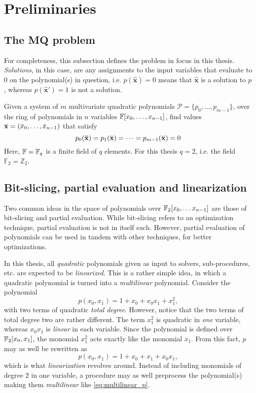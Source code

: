 \section{Preliminaries} \label{sec:prereq}
\subsection{The MQ problem} \label{sec:prereq:problem}
For completeness, this subsection defines the problem in focus in this thesis. \textit{Solutions}, in this case, are any assignments to the input variables that evaluate to $0$ on the polynomial(s) in question, i.e. $p(\hat{\mathbf{x}}) = 0$ means that $\hat{\mathbf{x}}$ is a solution to $p$, whereas $p(\hat{\mathbf{x}}') = 1$ is not a solution.
\begin{defn}\label{sec1:def:mq}
    Given a system of $m$ multivariate quadratic polynomials $\mathcal{P} = \{p_{0}, \dots, p_{m-1}\}$, over the ring of polynomials in $n$ variables $\mathbb{F}[x_0, \dots, x_{n - 1}]$, find values $\Bar{\mathbf{x}} = (\Bar{x}_0, \dots, \Bar{x}_{n - 1})$ that satisfy
    $$
        p_{0}(\mathbf{\Bar{\mathbf{x}}}) =  p_{1}(\Bar{\mathbf{x}}) = \dots = p_{m-1}(\Bar{\mathbf{x}}) = 0 
    $$
    Here, $\mathbb{F} = \mathbb{F}_q$ is a finite field of $q$ elements. For this thesis $q = 2$, i.e. the field $\mathbb{F}_2 = \mathbb{Z}_2$.
\end{defn}

\subsection{Bit-slicing, partial evaluation and linearization}
Two common ideas in the space of polynomials over $\mathbb{F}_2[x_0,\dots x_{n - 1}]$ are those of bit-slicing and partial evaluation. While bit-slicing refers to an optimization technique, partial evaluation is not in itself such. However, partial evaluation of polynomials can be used in tandem with other techniques, for better optimizations.

In this thesis, all \textit{quadratic} polynomials given as input to solvers, sub-procedures, etc. are expected to be \textit{linearized}. This is a rather simple idea, in which a quadratic polynomial is turned into a \textit{multilinear} polynomial. Consider the polynomial
$$
    p(x_0, x_1) = 1 + x_0 + x_0x_1 + x_1^2, 
$$
with two terms of quadratic \textit{total degree}. However, notice that the two terms of total degree two are rather different. The term $x_1^2$ is quadratic in \textit{one} variable, whereas $x_0x_1$ is \textit{linear} in each variable. Since the polynomial is defined over $\mathbb{F}_2[x_0,x_1]$, the monomial $x_1^2$ acts exactly like the monomial $x_1$. From this fact, $p$ may as well be rewritten as 
\begin{equation} \label{eq:multilinear_p}
    p(x_0, x_1) = 1 + x_0 + x_1 + x_0x_1,
\end{equation}
which is what \textit{linearization} revolves around. Instead of including monomials of degree $2$ in one variable, a procedure may as well preprocess the polynomial(s) making them \textit{multilinear} like \cref{eq:multilinear_p}.

